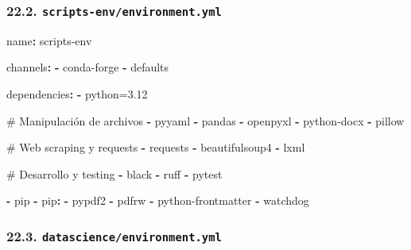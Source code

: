 \documentclass[
  doc,
  floatsintext,
  longtable,
  a4paper,
  nolmodern,
  notxfonts,
  notimes,
  12pt,
  colorlinks=true,linkcolor=blue,citecolor=blue,urlcolor=blue]{apa7}
\newenvironment{Shaded}{\begin{snugshade}}{\end{snugshade}}
\newcommand{\AttributeTok}[1]{\textcolor[rgb]{0.40,0.45,0.13}{#1}}
\newcommand{\CommentTok}[1]{\textcolor[rgb]{0.37,0.37,0.37}{#1}}
\newcommand{\FunctionTok}[1]{\textcolor[rgb]{0.28,0.35,0.67}{#1}}
\newcommand{\KeywordTok}[1]{\textcolor[rgb]{0.00,0.23,0.31}{\textbf{#1}}}
\begin{document}
\subsubsection{\texorpdfstring{22.2.
\texttt{scripts-env/environment.yml}}{22.2. scripts-env/environment.yml}}\label{scripts-envenvironment.yml}

\begin{Shaded}
\begin{Highlighting}[]
\FunctionTok{name}\KeywordTok{:}\AttributeTok{ scripts{-}env}

\FunctionTok{channels}\KeywordTok{:}
\AttributeTok{  }\KeywordTok{{-}}\AttributeTok{ conda{-}forge}
\AttributeTok{  }\KeywordTok{{-}}\AttributeTok{ defaults}

\FunctionTok{dependencies}\KeywordTok{:}
\AttributeTok{  }\KeywordTok{{-}}\AttributeTok{ python=3.12}

\CommentTok{  \# Manipulación de archivos}
\AttributeTok{  }\KeywordTok{{-}}\AttributeTok{ pyyaml}
\AttributeTok{  }\KeywordTok{{-}}\AttributeTok{ pandas}
\AttributeTok{  }\KeywordTok{{-}}\AttributeTok{ openpyxl}
\AttributeTok{  }\KeywordTok{{-}}\AttributeTok{ python{-}docx}
\AttributeTok{  }\KeywordTok{{-}}\AttributeTok{ pillow}

\CommentTok{  \# Web scraping y requests}
\AttributeTok{  }\KeywordTok{{-}}\AttributeTok{ requests}
\AttributeTok{  }\KeywordTok{{-}}\AttributeTok{ beautifulsoup4}
\AttributeTok{  }\KeywordTok{{-}}\AttributeTok{ lxml}

\CommentTok{  \# Desarrollo y testing}
\AttributeTok{  }\KeywordTok{{-}}\AttributeTok{ black}
\AttributeTok{  }\KeywordTok{{-}}\AttributeTok{ ruff}
\AttributeTok{  }\KeywordTok{{-}}\AttributeTok{ pytest}

\AttributeTok{  }\KeywordTok{{-}}\AttributeTok{ pip}
\AttributeTok{  }\KeywordTok{{-}}\AttributeTok{ }\FunctionTok{pip}\KeywordTok{:}
\AttributeTok{    }\KeywordTok{{-}}\AttributeTok{ pypdf2}
\AttributeTok{    }\KeywordTok{{-}}\AttributeTok{ pdfrw}
\AttributeTok{    }\KeywordTok{{-}}\AttributeTok{ python{-}frontmatter}
\AttributeTok{    }\KeywordTok{{-}}\AttributeTok{ watchdog}
\end{Highlighting}
\end{Shaded}

\subsubsection{\texorpdfstring{22.3.
\texttt{datascience/environment.yml}}{22.3. datascience/environment.yml}}\label{datascienceenvironment.yml}
\end{document}
